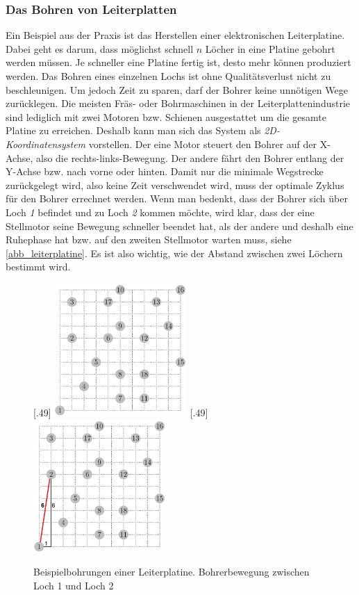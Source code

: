 \documentclass{article}
\begin{document}
\subsubsection{Das Bohren von Leiterplatten}

Ein Beispiel aus der Praxis ist das Herstellen einer elektronischen Leiterplatine. Dabei geht es darum, dass möglichst schnell $n$ Löcher in eine Platine gebohrt werden müssen. Je schneller eine Platine fertig ist, desto mehr können produziert werden. Das Bohren eines einzelnen Lochs ist ohne Qualitätsverlust nicht zu beschleunigen. Um jedoch Zeit zu sparen, darf der Bohrer keine unnötigen Wege zurücklegen. Die meisten Fräs- oder Bohrmaschinen in der Leiterplattenindustrie sind lediglich mit zwei Motoren bzw. Schienen ausgestattet um die gesamte Platine zu erreichen. Deshalb kann man sich das System als \textit{2D-Koordinatensystem} vorstellen. Der eine Motor steuert den Bohrer auf der X-Achse, also die rechts-links-Bewegung. Der andere fährt den Bohrer entlang der Y-Achse bzw. nach vorne oder hinten. Damit nur die minimale Wegstrecke zurückgelegt wird, also keine Zeit verschwendet wird, muss der optimale Zyklus für den Bohrer errechnet werden. Wenn man bedenkt, dass der Bohrer sich über Loch \textit{1} befindet und zu Loch \textit{2} kommen möchte, wird klar, dass der eine Stellmotor seine Bewegung schneller beendet hat, als der andere und deshalb eine Ruhephase hat bzw. auf den zweiten Stellmotor warten muss, siehe \autoref{abb_leiterplatine}. Es ist also wichtig, wie der Abstand zwischen zwei Löchern bestimmt wird.

\begin{figure}[h]
	\centering
	\subcaptionbox{\label{abb_leiterplatine}}[.49\linewidth]
	{
		\includegraphics[width=0.45\textwidth]{leiterplatine.jpg}
	}
	\hfill
	\subcaptionbox{\label{abb_leiterplatine2}}[.49\linewidth]
	{
		\includegraphics[width=0.45\textwidth]{leiterplatine2.jpg}
	}
	\caption{ Beispielbohrungen einer Leiterplatine.  Bohrerbewegung zwischen Loch 1 und Loch 2}
\end{figure}
\end{document}
